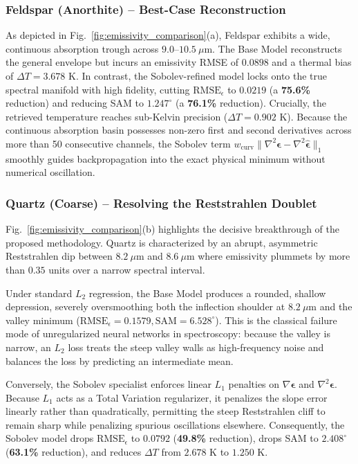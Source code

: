 \documentclass[journal]{IEEEtran}
\begin{document}
\subsubsection{Feldspar (Anorthite) -- Best-Case Reconstruction}
As depicted in Fig.~\ref{fig:emissivity_comparison}(a), Feldspar exhibits a wide, continuous absorption trough across $9.0\text{--}10.5\ \mu\text{m}$. The Base Model reconstructs the general envelope but incurs an emissivity RMSE of $0.0898$ and a thermal bias of $\Delta T = 3.678\text{ K}$. In contrast, the Sobolev-refined model locks onto the true spectral manifold with high fidelity, cutting $\text{RMSE}_\epsilon$ to $0.0219$ (a \textbf{75.6\%} reduction) and reducing SAM to $1.247^\circ$ (a \textbf{76.1\%} reduction). Crucially, the retrieved temperature reaches sub-Kelvin precision ($\Delta T = 0.902\text{ K}$). Because the continuous absorption basin possesses non-zero first and second derivatives across more than 50 consecutive channels, the Sobolev term $w_{\text{curv}} \|\nabla^2 \bm{\epsilon} - \nabla^2 \hat{\bm{\epsilon}}\|_1$ smoothly guides backpropagation into the exact physical minimum without numerical oscillation.

\subsubsection{Quartz (Coarse) -- Resolving the Reststrahlen Doublet}
Fig.~\ref{fig:emissivity_comparison}(b) highlights the decisive breakthrough of the proposed methodology. Quartz is characterized by an abrupt, asymmetric Reststrahlen dip between $8.2\ \mu\text{m}$ and $8.6\ \mu\text{m}$ where emissivity plummets by more than $0.35$ units over a narrow spectral interval. 

Under standard $L_2$ regression, the Base Model produces a rounded, shallow depression, severely oversmoothing both the inflection shoulder at $8.2\ \mu\text{m}$ and the valley minimum ($\text{RMSE}_\epsilon = 0.1579, \text{SAM} = 6.528^\circ$). This is the classical failure mode of unregularized neural networks in spectroscopy: because the valley is narrow, an $L_2$ loss treats the steep valley walls as high-frequency noise and balances the loss by predicting an intermediate mean.

Conversely, the Sobolev specialist enforces linear $L_1$ penalties on $\nabla \bm{\epsilon}$ and $\nabla^2 \bm{\epsilon}$. Because $L_1$ acts as a Total Variation regularizer, it penalizes the slope error linearly rather than quadratically, permitting the steep Reststrahlen cliff to remain sharp while penalizing spurious oscillations elsewhere. Consequently, the Sobolev model drops $\text{RMSE}_\epsilon$ to $0.0792$ (\textbf{49.8\%} reduction), drops SAM to $2.408^\circ$ (\textbf{63.1\%} reduction), and reduces $\Delta T$ from $2.678\text{ K}$ to $1.250\text{ K}$.
\end{document}
